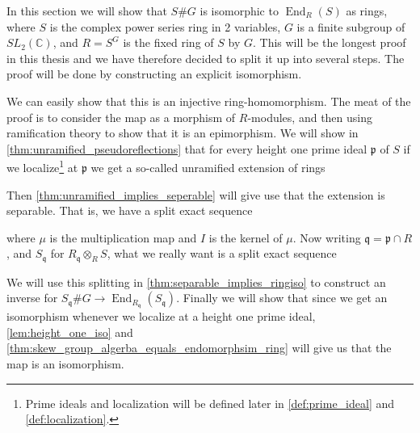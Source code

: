 \documentclass[11pt, a4paper, english]{article}
\theoremstyle{definition}
\newcommand{\C}{\mathbb{C}}
\DeclareMathOperator{\End}{End}
\begin{document}
In this section we will show that $S\#G$ is isomorphic to $\End_R(S)$ as rings, where $S$ is the complex power series ring in 2 variables, $G$ is a finite subgroup of $SL_2(\C)$, and $R = S^G$ is the fixed ring of $S$ by $G$. This will be the longest proof in this thesis and we have therefore decided to split it up into several steps. The proof will be done by constructing an explicit isomorphism.
\begin{center}
\end{center}
We can easily show that this is an injective ring-homomorphism. The meat of the proof is to consider the map as a morphism of $R$-modules, and then using ramification theory to show that it is an epimorphism. We will show in \cref{thm:unramified_pseudoreflections} that for every height one prime ideal $\mathfrak{p}$ of $S$ if we localize\footnote{Prime ideals and localization will be defined later in \cref{def:prime_ideal} and \cref{def:localization}.} at $\mathfrak{p}$ we get a so-called unramified extension of rings
\begin{center}
\end{center}
Then \cref{thm:unramified_implies_seperable} will give use that the extension is separable. That is, we have a split exact sequence
\begin{center}
\end{center}
where $\mu$ is the multiplication map and $I$ is the kernel of $\mu$. Now writing $\mathfrak{q} = \mathfrak{p} \cap R$, and $S_\mathfrak{q}$ for $R_\mathfrak{q} \otimes_R S$, what we really want is a split exact sequence
\begin{center}
\end{center}
We will use this splitting in \cref{thm:separable_implies_ringiso} to construct an inverse for $S_\mathfrak{q}\#G \to \End_{R_{\mathfrak{q}}}(S_\mathfrak{q})$. Finally we will show that since we get an isomorphism whenever we localize at a height one prime ideal, \cref{lem:height_one_iso} and \cref{thm:skew_group_algerba_equals_endomorphsim_ring} will give us that the map is an isomorphism.
\end{document}
